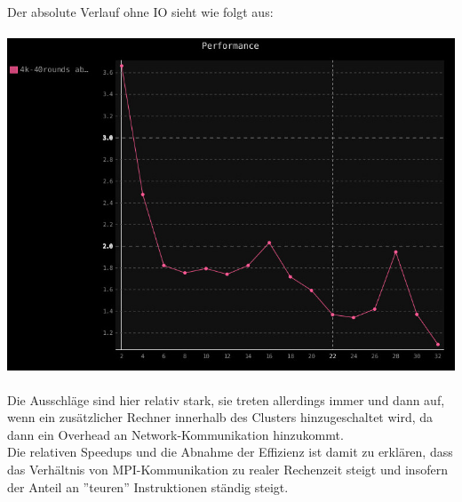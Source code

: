 \newpage
\quad \\
Der absolute Verlauf ohne IO sieht wie folgt aus: \\ \\
\includegraphics[scale=0.6]{pics/perf-abs.jpg}
\quad \\ \\
Die Ausschläge sind hier relativ stark, sie treten allerdings immer und dann auf, wenn ein zusätzlicher Rechner innerhalb des Clusters hinzugeschaltet wird, da dann ein Overhead an Network-Kommunikation
hinzukommt. \\
Die relativen Speedups und die Abnahme der Effizienz ist damit zu erklären, dass das Verhältnis von MPI-Kommunikation zu realer Rechenzeit steigt und insofern der Anteil an ''teuren'' Instruktionen ständig steigt.

